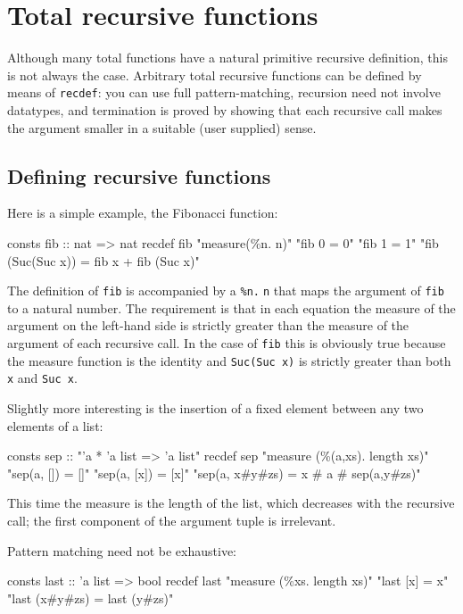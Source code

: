 \section{Total recursive functions}
\label{sec:recdef}


Although many total functions have a natural primitive recursive definition,
this is not always the case. Arbitrary total recursive functions can be
defined by means of \texttt{recdef}: you can use full pattern-matching,
recursion need not involve datatypes, and termination is proved by showing
that each recursive call makes the argument smaller in a suitable (user
supplied) sense.

\subsection{Defining recursive functions}

Here is a simple example, the Fibonacci function:
\begin{ttbox}
consts fib  :: nat => nat
recdef fib "measure(\%n. n)"
    "fib 0 = 0"
    "fib 1 = 1"
    "fib (Suc(Suc x)) = fib x + fib (Suc x)"
\end{ttbox}
The definition of \texttt{fib} is accompanied by a 
\texttt{\%n.$\;$n} that maps the argument of \texttt{fib} to a natural
number. The requirement is that in each equation the measure of the argument
on the left-hand side is strictly greater than the measure of the argument of
each recursive call. In the case of \texttt{fib} this is obviously true
because the measure function is the identity and \texttt{Suc(Suc~x)} is
strictly greater than both \texttt{x} and \texttt{Suc~x}.

Slightly more interesting is the insertion of a fixed element
between any two elements of a list:
\begin{ttbox}
consts sep :: "'a * 'a list => 'a list"
recdef sep "measure (\%(a,xs). length xs)"
    "sep(a, [])     = []"
    "sep(a, [x])    = [x]"
    "sep(a, x#y#zs) = x # a # sep(a,y#zs)"
\end{ttbox}
This time the measure is the length of the list, which decreases with the
recursive call; the first component of the argument tuple is irrelevant.

Pattern matching need not be exhaustive:
\begin{ttbox}
consts last :: 'a list => bool
recdef last "measure (\%xs. length xs)"
    "last [x]      = x"
    "last (x#y#zs) = last (y#zs)"
\end{ttbox}

